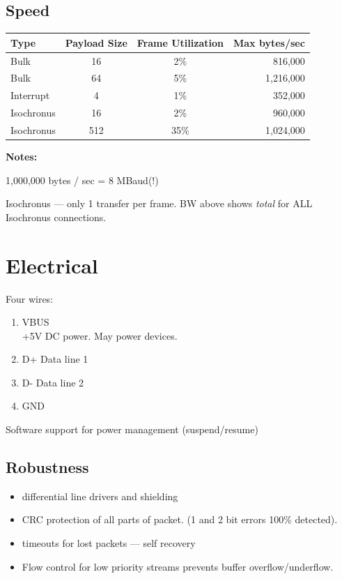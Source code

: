 

\subsection{Speed}
\begin{tabular}{|l|c|c|r|}
\hline
Type	&  Payload Size	& Frame Utilization & Max bytes/sec \\ \hline
\hline
Bulk	&  16		& 2\%		    & 816,000	    \\ \hline
Bulk	&  64		& 5\%		    & 1,216,000    \\ \hline
Interrupt & 4		& 1\%		    & 352,000    \\ \hline
Isochronus & 16		& 2\%		    & 960,000    \\ \hline
Isochronus & 512	& 35\%		    & 1,024,000 \\ \hline

\end{tabular}

{\bf Notes:}

 1,000,000 bytes / sec = 8 MBaud(!)

 Isochronus --- only 1 transfer per frame.  BW above shows {\it total }
 for ALL Isochronus connections.



\section{Electrical}
Four wires:
\begin{enumerate}
        \item V{\sc BUS} \\
        +5V DC power.  May power devices.
        \item D+  Data line 1
        \item D-  Data line 2
        \item GND
\end{enumerate}
Software support for power management (suspend/resume)

\subsection{Robustness}

\begin{itemize}
        \item differential line drivers and shielding
        \item CRC protection of all parts of packet.
        (1 and 2 bit errors 100\% detected).
        \item timeouts for lost packets --- self recovery
        \item Flow control for low priority streams
        prevents buffer overflow/underflow.
\end{itemize}

